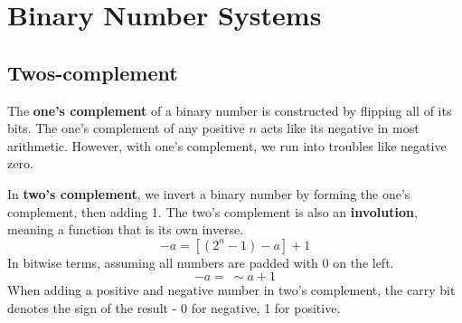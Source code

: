 \documentclass[11pt]{article}
\begin{document}
\section{Binary Number Systems}
	\subsection{Twos-complement}
		The \textbf{one's complement} of a binary number is constructed by flipping all of its bits. The one's complement of any positive $n$ acts like its negative in most arithmetic. However, with one's complement, we run into troubles like negative zero.
		
		In \textbf{two's complement}, we invert a binary number by forming the one's complement, then adding 1. The two's complement is also an \textbf{involution}, meaning a function that is its own inverse.
		\begin{equation}
			-a = [(2^n - 1) - a] + 1
		\end{equation}
		In bitwise terms, assuming all numbers are padded with 0 on the left.
		\begin{equation}
			-a =\ \sim a + 1
		\end{equation}
		When adding a positive and negative number in two's complement, the carry bit denotes the sign of the result - 0 for negative, 1 for positive.
	
%		
%		


\end{document}
